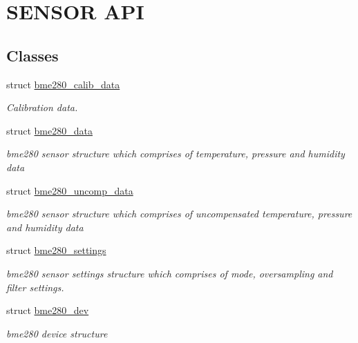 \hypertarget{group___b_m_e280}{}\section{S\+E\+N\+S\+OR A\+PI}
\label{group___b_m_e280}
\subsection*{Classes}
\begin{DoxyCompactItemize}
\item 
struct \hyperlink{structbme280__calib__data}{bme280\+\_\+calib\+\_\+data}
\begin{DoxyCompactList}\small\item\em Calibration data. \end{DoxyCompactList}\item 
struct \hyperlink{structbme280__data}{bme280\+\_\+data}
\begin{DoxyCompactList}\small\item\em bme280 sensor structure which comprises of temperature, pressure and humidity data \end{DoxyCompactList}\item 
struct \hyperlink{structbme280__uncomp__data}{bme280\+\_\+uncomp\+\_\+data}
\begin{DoxyCompactList}\small\item\em bme280 sensor structure which comprises of uncompensated temperature, pressure and humidity data \end{DoxyCompactList}\item 
struct \hyperlink{structbme280__settings}{bme280\+\_\+settings}
\begin{DoxyCompactList}\small\item\em bme280 sensor settings structure which comprises of mode, oversampling and filter settings. \end{DoxyCompactList}\item 
struct \hyperlink{structbme280__dev}{bme280\+\_\+dev}
\begin{DoxyCompactList}\small\item\em bme280 device structure \end{DoxyCompactList}\end{DoxyCompactItemize}

